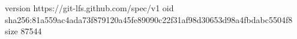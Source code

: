 version https://git-lfs.github.com/spec/v1
oid sha256:81a559ac4ada73f879120a45fe89090c22f31af98d30653d98a4fbdabc5504f8
size 87544
